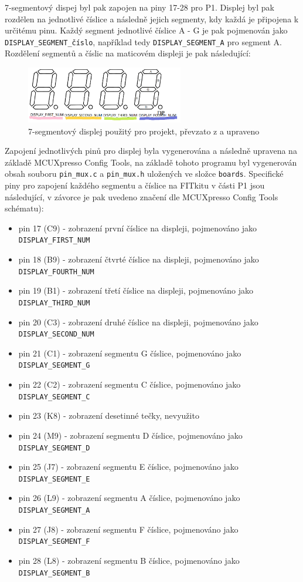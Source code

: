 \documentclass[a4paper, 11pt]{article}
\begin{document}
7-segmentový dispej byl pak zapojen na piny 17-28 pro P1. Displej byl pak rozdělen na jednotlivé číslice a následně jejich segmenty, kdy každá je připojena k určitému pinu. Každý segment jednotlivé číslice A - G je pak pojmenován jako \verb|DISPLAY_SEGMENT_číslo|, například tedy \verb|DISPLAY_SEGMENT_A| pro segment A.  Rozdělení segmentů a číslic na maticovém displeji je pak následující:
\begin{figure}[htbp]
    \centering
    \includegraphics[width=260]{disp.png}
     \caption{7-segmentový displej použitý pro projekt, převzato z \cite{Displaydoc:web} a upraveno}
\end{figure}


Zapojení jednotlivých pinů pro displej byla vygenerována a následně upravena na základě MCUXpresso Config Tools, na základě tohoto programu byl vygenerován obsah souboru \verb|pin_mux.c| a \verb|pin_mux.h| uložených ve složce \verb|boards|. Specifické piny pro zapojení každého segmentu a číslice na FITkitu v části P1 jsou následující, v závorce je pak uvedeno značení dle MCUXpresso Config Tools schématu):
\begin{itemize}
    \item pin 17 (C9) - zobrazení první číslice na displeji, pojmenováno jako \verb|DISPLAY_FIRST_NUM|
    \item pin 18 (B9) - zobrazení čtvrté číslice na displeji, pojmenováno jako \verb|DISPLAY_FOURTH_NUM|
    \item pin 19 (B1) - zobrazení třetí číslice na displeji, pojmenováno jako \verb|DISPLAY_THIRD_NUM|
    \item pin 20 (C3) - zobrazení druhé číslice na displeji, pojmenováno jako \verb|DISPLAY_SECOND_NUM|
    \item pin 21 (C1) - zobrazení segmentu G číslice, pojmenováno jako \verb|DISPLAY_SEGMENT_G|
    \item pin 22 (C2) - zobrazení segmentu C číslice, pojmenováno jako \verb|DISPLAY_SEGMENT_C|
    \item pin 23 (K8) - zobrazení desetinné tečky, nevyužito
    \item pin 24 (M9) - zobrazení segmentu D číslice, pojmenováno jako \verb|DISPLAY_SEGMENT_D|
    \item pin 25 (J7) - zobrazení segmentu E číslice, pojmenováno jako \verb|DISPLAY_SEGMENT_E|
    \item pin 26 (L9) - zobrazení segmentu A číslice, pojmenováno jako \verb|DISPLAY_SEGMENT_A|
    \item pin 27 (J8) - zobrazení segmentu F číslice, pojmenováno jako \verb|DISPLAY_SEGMENT_F|
    \item pin 28 (L8) - zobrazení segmentu B číslice, pojmenováno jako \verb|DISPLAY_SEGMENT_B|
\end{itemize}
\end{document}
